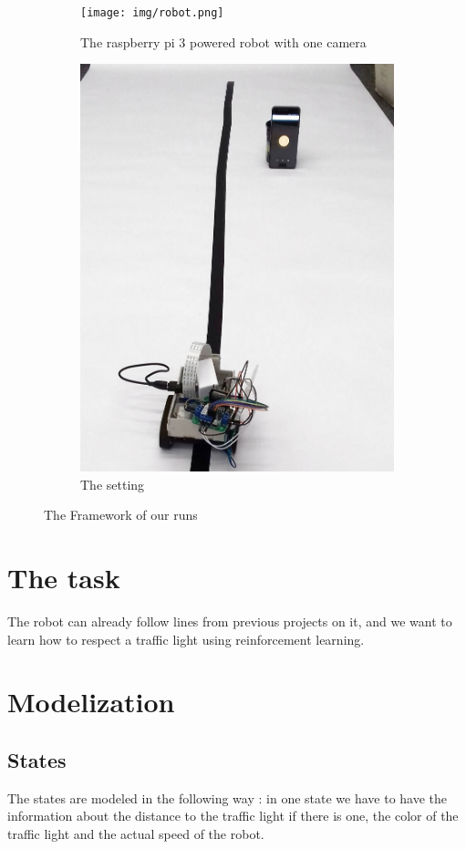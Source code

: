 \documentclass[14pt,a4paper]{article}
\theoremstyle{definition}
\begin{document}
\begin{figure}[H]
\centering
\begin{subfigure}{.5\textwidth}
  \centering
  \texttt{[image: img/robot.png]}
  \caption{The raspberry pi 3 powered robot with one camera}
  \label{fig:sub1}
\end{subfigure}%
\begin{subfigure}{.5\textwidth}
  \centering
  \includegraphics[width=.5\linewidth]{img/setting1_mod1.png}
  \caption{The setting}
  \label{fig:sub2}
\end{subfigure}
\caption{The Framework of our runs}
\label{fig:test}
\end{figure}



\section{The task}
The robot can already follow lines from previous projects on it, and we want to learn how to respect a traffic light using reinforcement learning. 

\section{Modelization}

\subsection{States}
The states are modeled in the following way : in one state we have to have the information about the distance to the traffic light if there is one, the color of the traffic light and the actual speed of the robot.
\end{document}
